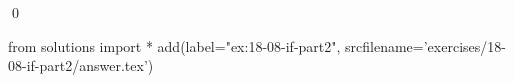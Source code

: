 
\begin{ex}
  \label{ex:18-08-if-part2}
  
  \qed
\end{ex}
\begin{python0}
from solutions import *
add(label="ex:18-08-if-part2",
    srcfilename='exercises/18-08-if-part2/answer.tex')
\end{python0}
